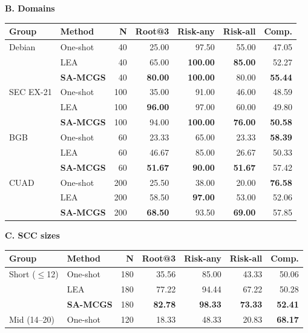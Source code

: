 \begin{table}[t]
\par\medskip
\begin{minipage}[t]{.49\textwidth}
\centering
\textbf{B. Domains}\\[0.5mm]
\begin{tabular}{@{}llrrrrr@{}}
\toprule
Group & Method & N & Root@3 & Risk-any & Risk-all & Comp. \\
\midrule
Debian & One-shot & 40 & 25.00 & 97.50 & 55.00 & 47.05 \\
 & LEA & 40 & 65.00 & \textbf{100.00} & \textbf{85.00} & 52.27 \\
 & \textbf{SA-MCGS} & 40 & \textbf{80.00} & \textbf{100.00} & 80.00 & \textbf{55.44} \\
\midrule
SEC EX-21 & One-shot & 100 & 35.00 & 91.00 & 46.00 & 48.59 \\
 & LEA & 100 & \textbf{96.00} & 97.00 & 60.00 & 49.80 \\
 & \textbf{SA-MCGS} & 100 & 94.00 & \textbf{100.00} & \textbf{76.00} & \textbf{50.58} \\
\midrule
BGB & One-shot & 60 & 23.33 & 65.00 & 23.33 & \textbf{58.39} \\
 & LEA & 60 & 46.67 & 85.00 & 26.67 & 50.33 \\
 & \textbf{SA-MCGS} & 60 & \textbf{51.67} & \textbf{90.00} & \textbf{51.67} & 57.42 \\
\midrule
CUAD & One-shot & 200 & 25.50 & 38.00 & 20.00 & \textbf{76.58} \\
 & LEA & 200 & 58.50 & \textbf{97.00} & 53.00 & 52.06 \\
 & \textbf{SA-MCGS} & 200 & \textbf{68.50} & 93.50 & \textbf{69.00} & 57.85 \\
\bottomrule
\end{tabular}
\end{minipage}\hfill
\begin{minipage}[t]{.49\textwidth}
\centering
\textbf{C. SCC sizes}\\[0.5mm]
\begin{tabular}{@{}llrrrrr@{}}
\toprule
Group & Method & N & Root@3 & Risk-any & Risk-all & Comp. \\
\midrule
Short ($\leq$12) & One-shot & 180 & 35.56 & 85.00 & 43.33 & 50.06 \\
 & LEA & 180 & 77.22 & 94.44 & 67.22 & 50.28 \\
 & \textbf{SA-MCGS} & 180 & \textbf{82.78} & \textbf{98.33} & \textbf{73.33} & \textbf{52.41} \\
\midrule
Mid (14--20) & One-shot & 120 & 18.33 & 48.33 & 20.83 & \textbf{68.17} \\

\end{tabular}
\end{minipage}
\end{table}
